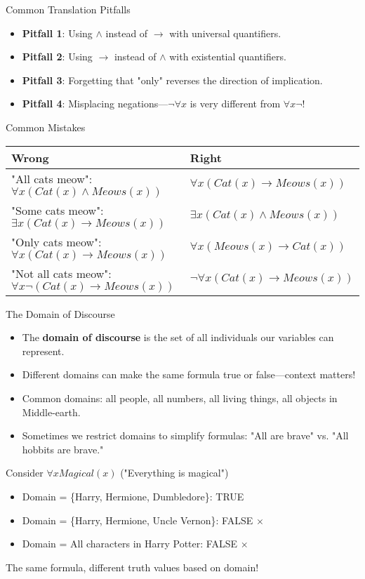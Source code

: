 \documentclass{beamer}
\begin{document}
	\begin{frame}{Common Translation Pitfalls}
		\begin{itemize}
			\item \textbf{Pitfall 1}: Using $\wedge$ instead of $\rightarrow$ with universal quantifiers.
			\item \textbf{Pitfall 2}: Using $\rightarrow$ instead of $\wedge$ with existential quantifiers.
			\item \textbf{Pitfall 3}: Forgetting that "only" reverses the direction of implication.
			\item \textbf{Pitfall 4}: Misplacing negations—$\neg \forall x$ is very different from $\forall x \neg$!
		\end{itemize}
		
		\begin{alertblock}{Common Mistakes}
			\scriptsize
			\begin{tabular}{ll}
				\textbf{Wrong} & \textbf{Right} \\
				\hline
				"All cats meow": $\forall x (Cat(x) \wedge Meows(x))$ & $\forall x (Cat(x) \rightarrow Meows(x))$ \\
				"Some cats meow": $\exists x (Cat(x) \rightarrow Meows(x))$ & $\exists x (Cat(x) \wedge Meows(x))$ \\
				"Only cats meow": $\forall x (Cat(x) \rightarrow Meows(x))$ & $\forall x (Meows(x) \rightarrow Cat(x))$ \\
				"Not all cats meow": $\forall x \neg (Cat(x) \rightarrow Meows(x))$ & $\neg \forall x (Cat(x) \rightarrow Meows(x))$
			\end{tabular}
		\end{alertblock}
	\end{frame}
	
	\begin{frame}{The Domain of Discourse}
		\begin{itemize}
			\item The \textbf{domain of discourse} is the set of all individuals our variables can represent.
			\item Different domains can make the same formula true or false—context matters!
			\item Common domains: all people, all numbers, all living things, all objects in Middle-earth.
			\item Sometimes we restrict domains to simplify formulas: "All are brave" vs. "All hobbits are brave."
		\end{itemize}
		
		\begin{example}
			Consider $\forall x Magical(x)$ ("Everything is magical")
			\begin{itemize}
				\item Domain = \{Harry, Hermione, Dumbledore\}: TRUE \checkmark
				\item Domain = \{Harry, Hermione, Uncle Vernon\}: FALSE $\times$
				\item Domain = All characters in Harry Potter: FALSE $\times$
			\end{itemize}
			The same formula, different truth values based on domain!
		\end{example}
	\end{frame}
	
\end{document}
